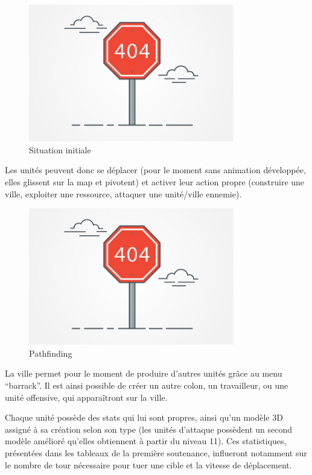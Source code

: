 \documentclass[12pt]{report}
\begin{document}
\begin{figure}[H]
    \centering
    \includegraphics[width=0.8\textwidth]{404}
    \caption{Situation initiale}
\end{figure}

Les unités peuvent donc se déplacer (pour le moment sans animation développée, elles glissent sur la map et pivotent) et activer leur action propre (construire une ville, exploiter une ressource, attaquer une unité/ville ennemie).

\begin{figure}[H]
    \centering
    \includegraphics[width=0.8\textwidth]{404}
    \caption{Pathfinding}
\end{figure}

La ville permet pour le moment de produire d’autres unités grâce au menu “barrack”. Il est ainsi possible de créer un autre colon, un travailleur, ou une unité offensive, qui apparaîtront sur la ville.

Chaque unité possède des stats qui lui sont propres, ainsi qu’un modèle 3D assigné à sa création selon son type (les unités d’attaque possèdent un second modèle amélioré qu’elles obtiennent à partir du niveau 11). Ces statistiques, présentées dans les tableaux de la première soutenance, influeront notamment sur le nombre de tour nécessaire pour tuer une cible et  la vitesse de déplacement.
\end{document}
